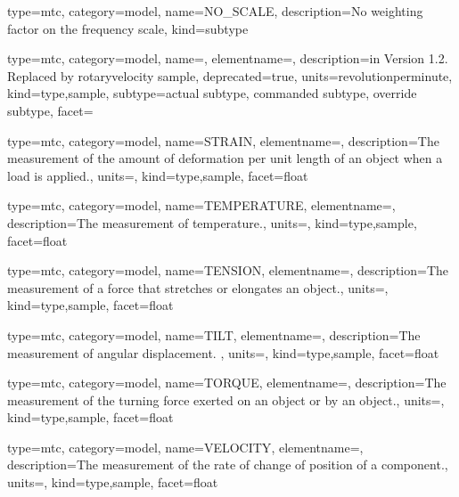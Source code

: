 {
  type=mtc,
  category=model,
  name={NO\_SCALE},
  description={No weighting factor on the frequency scale},
  kind={subtype}
}


{
  type=mtc,
  category=model,
  name={},
  elementname=,
  description={\DEPRECATED in Version 1.2.  Replaced by \gls{rotaryvelocity sample}},
  deprecated={true},
  units={\gls{revolutionperminute}},
  kind={type,sample},
  subtype={\gls{actual subtype}, \gls{commanded subtype}, \gls{override subtype}},
  facet={}
}



{
  type=mtc,
  category=model,
  name={STRAIN},
  elementname=,
  description={The measurement of the amount of deformation per unit length of an object when a load is applied.},
  units=,
  kind={type,sample},
  facet={\gls{float}}
}


{
  type=mtc,
  category=model,
  name={TEMPERATURE},
  elementname=,
  description={The measurement of temperature.},
  units=,
  kind={type,sample},
  facet={\gls{float}}
}


{
  type=mtc,
  category=model,
  name={TENSION},
  elementname=,
  description={The measurement of a force that stretches or elongates an object.},
  units=,
  kind={type,sample},
  facet={\gls{float}}
}


{
  type=mtc,
  category=model,
  name={TILT},
  elementname=,
  description={The measurement of angular displacement. },
  units=,
  kind={type,sample},
  facet={\gls{float}}
}


{
  type=mtc,
  category=model,
  name={TORQUE},
  elementname=,
  description={The measurement of the turning force exerted on an object or by an object.},
  units=,
  kind={type,sample},
  facet={\gls{float}}
}


{
  type=mtc,
  category=model,
  name={VELOCITY},
  elementname=,
  description={The measurement of the rate of change of position of a \gls{component}.},
  units=,
  kind={type,sample},
  facet={\gls{float}}
}


